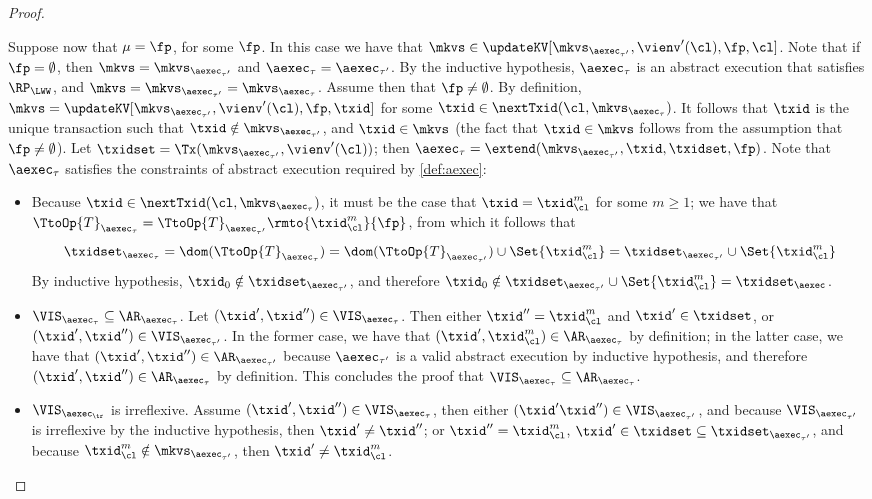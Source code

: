 \begin{proof}
\begin{itemize}
Suppose now that $\mu = \fp$, for some $\fp$. In this case we have that  
$\mkvs \in \updateKV[\mkvs_{\aexec_{\tau'}}, \vienv'(\cl), \fp, \cl]$. Note that if 
$\fp = \emptyset$, then $\mkvs = \mkvs_{\aexec_{\tau'}}$ and $\aexec_{\tau} = \aexec_{\tau'}$. 
By the inductive hypothesis, $\aexec_{\tau}$ is an abstract execution that satisfies 
$\RP_{\LWW}$, and $\mkvs = \mkvs_{\aexec_{\tau'}} = \mkvs_{\aexec_{\tau}}$. 
Assume then that $\fp \neq \emptyset$. 
By definition, $\mkvs = \updateKV[\mkvs_{\aexec_{\tau'}}, \vienv'(\cl), \fp, \txid]$ 
for some $\txid \in \nextTxid(\cl, \mkvs_{\aexec_{\tau}})$. It follows that $\txid$ 
is the unique transaction such that $\txid \notin \mkvs_{\aexec_{\tau'}}$, and $\txid \in \mkvs$ 
(the fact that $\txid \in \mkvs$ follows from the assumption that $\fp \neq \emptyset$). Let 
$\txidset = \Tx(\mkvs_{\aexec_{\tau'}}, \vienv'(\cl))$; then $\aexec_{\tau} = \extend(\mkvs_{\aexec_{\tau'}}, \txid, \txidset, \fp)$. 
Note that $\aexec_{\tau}$ satisfies the constraints of abstract execution required by \cref{def:aexec}:
\begin{itemize}
\item  Because $\txid \in \nextTxid(\cl, \mkvs_{\aexec_{\tau}})$, it must be the case that $\txid = \txid_{\cl}^{m}$ for some 
$m \geq 1$; we have that $\TtoOp{T}_{\aexec_{\tau}} = \TtoOp{T}_{\aexec_{\tau'}}\rmto{\txid_{\cl}^{m}}{\fp}$, 
from which it follows that 
\[
\txidset_{\aexec_{\tau}} = \dom(\TtoOp{T}_{\aexec_{\tau}}) = \dom(\TtoOp{T}_{\aexec_{\tau'}}) \cup 
\Set{\txid_{\cl}^{m} } = \txidset_{\aexec_{\tau'}} \cup \Set{\txid_{\cl}^{m} }
\]
By inductive hypothesis, $\txid_0 \notin \txidset_{\aexec_{\tau'}}$, and therefore $\txid_{0} \notin 
\txidset_{\aexec_{\tau'}} \cup \Set{\txid_{\cl}^{m} } = \txidset_{\aexec}$.

\item \( \VIS_{\aexec_{\tau}} \subseteq \AR_{\aexec_{\tau}} \).
    Let $(\txid' ,\txid'') \in \VIS_{\aexec_{\tau}}$. Then either $\txid'' = \txid_{\cl}^{m}$ and $\txid' \in \txidset$, or $(\txid', \txid'') \in 
\VIS_{\aexec_{\tau'}}$. In the former case, we have that $(\txid', \txid_{\cl}^{m}) \in \AR_{\aexec_{\tau}}$ by definition; 
in the latter case, we have that $(\txid', \txid'') \in \AR_{\aexec_{\tau'}}$ because $\aexec_{\tau'}$ is a valid 
abstract execution by inductive hypothesis, and therefore $(\txid', \txid'') \in \AR_{\aexec_{\tau}}$ by definition. 
This concludes the proof that $\VIS_{\aexec_{\tau}} \subseteq \AR_{\aexec_{\tau}}$. 
\item \( \VIS_{\aexec_\tr} \) is irreflexive.
Assume $(\txid', \txid'') \in \VIS_{\aexec_{\tau}}$, then either 
$(\txid' \txid'') \in \VIS_{\aexec_{\tau'}}$, and because $\VIS_{\aexec_{\tau'}}$ is irreflexive by the inductive hypothesis, 
then $\txid' \neq \txid''$; 
or $\txid'' = \txid_{\cl}^{m}$, $\txid' \in \txidset \subseteq \txidset_{\aexec_{\tau'}}$, 
and because $\txid_{\cl}^{m} \notin \mkvs_{\aexec_{\tau'}}$, then $\txid' \neq \txid_{\cl}^{m}$. 


\end{itemize}
\end{itemize}
\end{proof}
